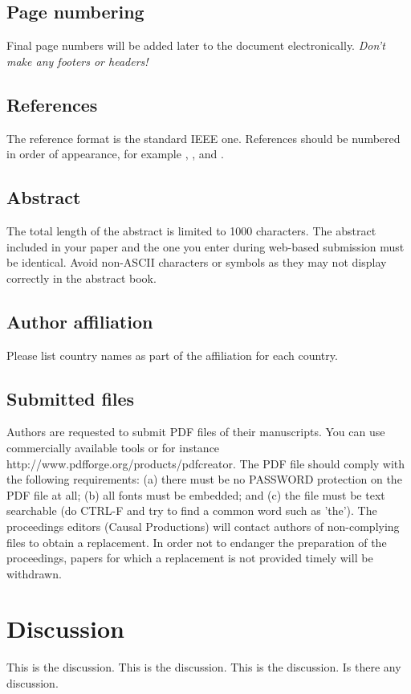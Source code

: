 \documentclass{article}
\begin{document}
\subsection{Page numbering}

Final page numbers will be added later to the document
electronically. 
{\em Don't make any footers or headers!}

\subsection{References}

The reference format is the standard IEEE one.
References should be numbered in order of appearance, 
for example \cite{ES1}, \cite{ES2}, and \cite{ES3}. 

\subsection{Abstract}

The total length of the abstract is limited to 1000 characters. The
abstract included in your paper and the one you enter during web-based
submission must be identical. Avoid non-ASCII characters or symbols as they
may not display correctly in the abstract book.

\subsection{Author affiliation}
Please list country names as part of the affiliation for each country.

\subsection{Submitted files}
Authors are requested to submit PDF files of their manuscripts. You
can use commercially available tools or for instance
http://www.pdfforge.org/products/pdfcreator.  The PDF file should
comply with the following requirements: (a) there must be no PASSWORD
protection on the PDF file at all; (b) all fonts must be embedded; and
(c) the file must be text searchable (do CTRL-F and try to find a
common word such as 'the'). The proceedings editors (Causal
Productions) will contact authors of non-complying files to obtain a
replacement. In order not to endanger the preparation of the
proceedings, papers for which a replacement is not provided timely
will be withdrawn.

\section{Discussion}
This is the discussion. This is the discussion. This is the discussion. 
Is there any discussion.
\end{document}
